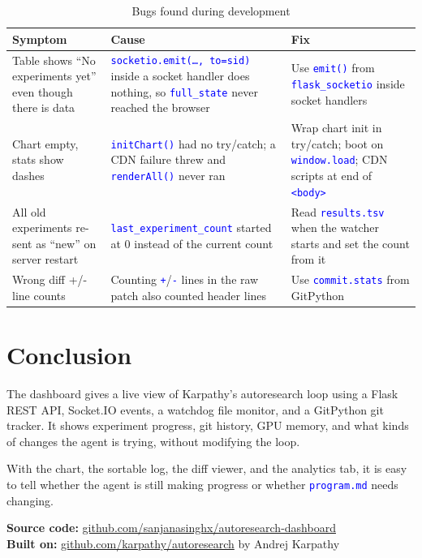 \documentclass[11pt,a4paper]{article}
\newcommand{\code}[1]{\texttt{\textcolor{blue}{#1}}}
\begin{document}
\begin{table}[h]
\centering
\caption{Bugs found during development}
\label{tab:bugs}
\begin{tabular}{@{}p{3.2cm}p{5.5cm}p{5.5cm}@{}}
\toprule
\textbf{Symptom} & \textbf{Cause} & \textbf{Fix} \\
\midrule
Table shows ``No experiments yet'' even though there is data &
\code{socketio.emit(\ldots, to=sid)} inside a socket handler does nothing, so
\code{full\_state} never reached the browser &
Use \code{emit()} from \code{flask\_socketio} inside socket handlers \\
\addlinespace
Chart empty, stats show dashes &
\code{initChart()} had no try/catch; a CDN failure threw and \code{renderAll()} never ran &
Wrap chart init in try/catch; boot on \code{window.load}; CDN scripts at end of \code{<body>} \\
\addlinespace
All old experiments re-sent as ``new'' on server restart &
\code{last\_experiment\_count} started at 0 instead of the current count &
Read \code{results.tsv} when the watcher starts and set the count from it \\
\addlinespace
Wrong diff +/- line counts &
Counting \code{+}/\code{-} lines in the raw patch also counted header lines &
Use \code{commit.stats} from GitPython \\
\bottomrule
\end{tabular}
\end{table}

\section{Conclusion}

The dashboard gives a live view of Karpathy's autoresearch loop using a Flask REST API, Socket.IO
events, a watchdog file monitor, and a GitPython git tracker. It shows experiment progress, git
history, GPU memory, and what kinds of changes the agent is trying, without modifying the loop.

With the chart, the sortable log, the diff viewer, and the analytics tab, it is easy to tell whether
the agent is still making progress or whether \code{program.md} needs changing.

\vspace{1em}
\begin{infobox}
\textbf{Source code:} \href{https://github.com/sanjanasinghx/autoresearch-dashboard}{github.com/sanjanasinghx/autoresearch-dashboard}\\
\textbf{Built on:} \href{https://github.com/karpathy/autoresearch}{github.com/karpathy/autoresearch} by Andrej Karpathy
\end{infobox}
\end{document}
